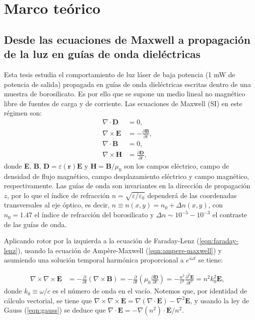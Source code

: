 \chapter{Marco teórico}

\section{Desde las ecuaciones de Maxwell a propagación de la luz en guías de onda dieléctricas}

Esta tesis estudia el comportamiento de luz láser de baja potencia (1 mW de potencia de salida) propagada en guías de onda dieléctricas escritas dentro de una muestra de borosilicato. Es por ello que se supone un medio lineal no magnético libre de fuentes de carga y de corriente. Las ecuaciones de Maxwell (SI) en este régimen son:
\begin{align}
	\nabla\cdot\textbf{D} &= 0, \label{eqn:gauss}
	\\	
	\nabla\times\textbf{E} &= -\frac{\partial \textbf{B}}{\partial t}, \label{eqn:faraday-lenz}
	\\	
	\nabla\cdot\textbf{B} &= 0,
	\\	
	\nabla\times\textbf{H} &= \frac{\partial \textbf{D}}{\partial t}, \label{eqn:ampere-maxwell}
\end{align}
donde \textbf{E}, \textbf{B}, $\textbf{D}=\varepsilon(\textbf{r})\textbf{E}$ y $\textbf{H}=\textbf{B}/\mu_0$ son los campos eléctrico, campo de densidad de flujo magnético, campo desplazamiento eléctrico y campo magnético, respectivamente. Las guías de onda son invariantes en la dirección de propagación $z$, por lo que el índice de refracción $n=\sqrt{\varepsilon/\varepsilon_0}$ dependerá de las coordenadas transversales al eje óptico, es decir, $n \equiv n(x,y) = n_0 + \Delta n(x,y)$, con $n_0=1.47$ el índice de refracción del borosilicato y $\Delta n \sim 10^{-5}-10^{-3}$ el contraste de las guías de onda.

Aplicando rotor por la izquierda a la ecuación de Faraday-Lenz (\ref{eqn:faraday-lenz}), usando la ecuación de Ampère-Maxwell (\ref{eqn:ampere-maxwell}) y asumiendo una solución temporal harmónica proporcional a $e^{i\omega t}$ se tiene:

\begin{align}
	\nabla\times\nabla\times\textbf{E} &= -\frac{\partial}{\partial t}(\nabla\times\textbf{B}) = -\frac{\partial}{\partial t}\left(\mu_0\frac{\partial \textbf{D}}{\partial t}\right) = -\frac{n^2}{c^2}\frac{\partial^2 \textbf{E}}{\partial t^2} = n^2k_0^2 \textbf{E}, \label{eqn:rotordoble}
\end{align}
donde $k_0 \equiv \omega/c$ es el número de onda en el vacío. Notemos que, por identidad de cálculo vectorial, se tiene que $\nabla\times\nabla\times\textbf{E} = \nabla(\nabla\cdot\textbf{E}) - \nabla^2\textbf{E}$, y usando la ley de Gauss (\ref{eqn:gauss}) se deduce que $\nabla\cdot \textbf{E} = -\nabla(n^2)\cdot\textbf{E}/n^2$.

